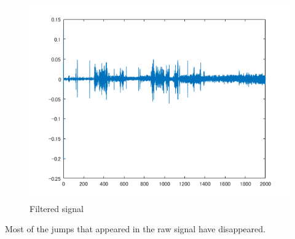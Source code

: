 \documentclass[dvipdfmx]{article}
\begin{document}
\begin{figure}[H]
\begin{center}
\includegraphics[width=0.8\linewidth]{"./img/filtered.png"}
\end{center}
\caption{Filtered signal}
\end{figure}

Most of the jumps that appeared in the raw signal have disappeared.
\end{document}
